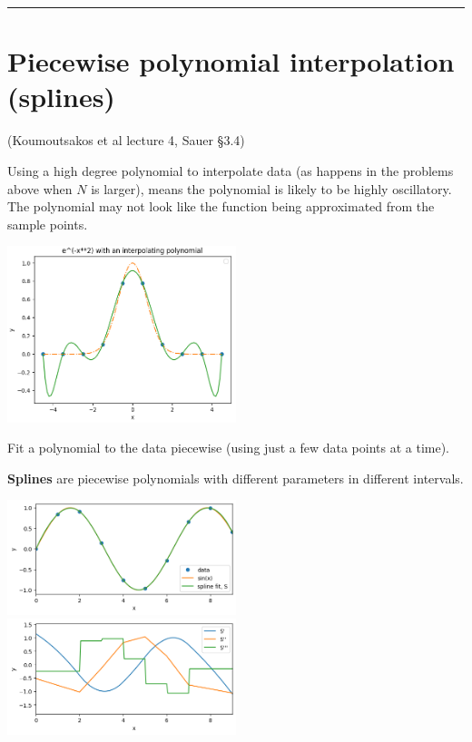 \documentclass[12pt,letterpaper,noanswers]{exam}
\begin{document}
\vspace{0.2cm}
\hrule
\vspace{0.2cm}



\section*{Piecewise polynomial interpolation (splines)}

(Koumoutsakos et al lecture 4, Sauer \S 3.4)

Using a high degree polynomial to interpolate data (as happens in the problems above when $N$ is larger), means the polynomial is likely to be highly oscillatory.  The polynomial may not look like the function being approximated from the sample points.

\includegraphics[width=0.5\textwidth]{img/C08gaussinterp.png}

\begin{tcolorbox}
Fit a polynomial to the data piecewise (using just a few data points at a time).

\textbf{Splines} are piecewise polynomials with different parameters in different intervals.
\end{tcolorbox}


\includegraphics[width=0.5\textwidth]{img/Class09sinspline.png}
\includegraphics[width=0.5\textwidth]{img/Class09deriv.png}
\end{document}

